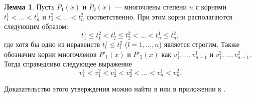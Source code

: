 \documentclass[specialist,
               substylefile = spbu.rtx,
               subf,href,colorlinks=true, 12pt]{disser}
\theoremstyle{definition}
\newtheorem{lemma}{Лемма}
\begin{document}
  \begin{lemma}
  \label{lemma:droots}
  	Пусть $P_1(x)$ и $P_2(x)$ --- многочлены степени $n$ с корнями $t^1_1 < \ldots < t^1_n$ и $t^2_1 < \ldots < t^2_n$ соответственно. При этом корни располагаются следующим образом:
  	\begin{equation*}
  		t^1_1 \leqslant t^2_1 < t^1_2 \leqslant t^2_2 < \ldots < t^1_n \leqslant t^2_n,
  	\end{equation*}
  	где хотя бы одно из неравенств $t_l^1 \leqslant t_l^2$ ($l = 1, \ldots, n$) является строгим. Также обозначим корни многочленов $P'_1(x)$ и $P'_2(x)$ как $v_1^1, \ldots, v_{n-1}^1$ и $v_1^2, \ldots, v_{n-1}^2$. Тогда справедливо следующее выражение
  	\begin{equation*}
  		v^1_1 < v^2_1 < v^1_2 < v^2_2 < \ldots < v^1_n < v^2_n.
  	\end{equation*}
  \end{lemma}
  Доказательство этого утверждения можно найти в \cite{sahmphd} или в приложении к \cite{melasmain}.
	
\end{document}
